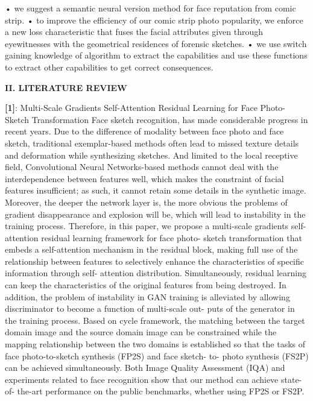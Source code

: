 \documentclass[journal]{IEEEtran} %
\begin{document}
• we suggest a semantic neural version method for face reputation from comic strip.
• to improve the efficiency of our comic strip photo popularity, we enforce a new loss characteristic that fuses the facial attributes given through eyewitnesses with the geometrical residences of forensic sketches.
• we use switch gaining knowledge of algorithm to extract the capabilities and use these functions to extract other capabilities to get correct consequences.

\vspace\textbf{\textbf{II. LITERATURE REVIEW}}

\textbf{[1]}:
Multi-Scale Gradients Self-Attention Residual Learning for Face          Photo-Sketch Transformation
Face sketch recognition, has made considerable progress in recent years. Due to the difference of modality between face photo and face sketch, traditional exemplar-based methods often lead to missed texture details and deformation while synthesizing sketches. And limited to the local receptive field, Convolutional Neural Networks-based methods cannot deal with the interdependence between features well, which makes the constraint of facial features insufficient; as such, it cannot retain some details in the synthetic image.
Moreover, the deeper the network layer is, the more obvious the problems of gradient disappearance and explosion will be, which will lead to instability in the training process. Therefore, in this paper, we propose a multi-scale gradients self- attention residual learning framework for face photo- sketch transformation that embeds a self-attention mechanism in the residual block, making full use of the relationship between features to selectively enhance the characteristics of specific information through self- attention distribution. Simultaneously, residual learning can keep the characteristics of the original features from being destroyed.
In addition, the problem of instability in GAN training is alleviated by allowing discriminator to become a function of multi-scale out- puts of the generator in the training process. Based on cycle framework, the matching between the target domain image and the source domain image can be constrained while the mapping relationship between the two domains is established so that the tasks of face photo-to-sketch synthesis (FP2S) and face sketch- to- photo synthesis (FS2P) can be achieved simultaneously. Both Image Quality Assessment (IQA) and experiments related to face recognition show that our method can achieve state-of- the-art performance on the public benchmarks, whether using FP2S or FS2P.
\end{document}
